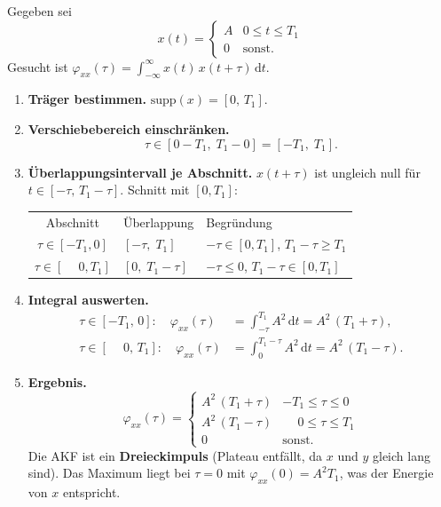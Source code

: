 \begin{beispiel}

Gegeben sei
$$
x(t) = \begin{cases} A & 0 \leq t \leq T_1 \\ 0 & \text{sonst.} \end{cases}
$$
Gesucht ist $\varphi_{xx}(\tau) = \int_{-\infty}^{\infty} x(t)\,x(t+\tau)\,\mathrm{d}t$.

\begin{enumerate}
  \item \textbf{Träger bestimmen.}
  $\mathrm{supp}(x) = [0,\,T_1]$.

  \item \textbf{Verschiebebereich einschränken.}
  $$\tau \in [0 - T_1,\; T_1 - 0] = [-T_1,\; T_1].$$

  \item \textbf{Überlappungsintervall je Abschnitt.}
  $x(t+\tau)$ ist ungleich null für $t \in [-\tau,\, T_1-\tau]$.
  Schnitt mit $[0, T_1]$:

  \begin{center}
  \begin{tabular}{cll}
    Abschnitt & Überlappung & Begründung \\[3pt]
    $\tau \in [-T_1, 0]$ & $[-\tau,\; T_1]$       & $-\tau \in [0,T_1]$,\; $T_1{-}\tau \geq T_1$ \\
    $\tau \in [\phantom{-}0, T_1]$ & $[0,\; T_1{-}\tau]$ & $-\tau \leq 0$,\; $T_1{-}\tau \in [0,T_1]$
  \end{tabular}
  \end{center}

  \item \textbf{Integral auswerten.}
  \begin{align*}
    \tau \in [-T_1,\, 0]\colon\quad
      \varphi_{xx}(\tau) &= \int_{-\tau}^{T_1} A^2\,\mathrm{d}t
        = A^2\,(T_1 + \tau), \\
    \tau \in [\phantom{-}0,\, T_1]\colon\quad
      \varphi_{xx}(\tau) &= \int_{0}^{T_1-\tau} A^2\,\mathrm{d}t
        = A^2\,(T_1 - \tau).
  \end{align*}

  \item \textbf{Ergebnis.}
  $$
  \varphi_{xx}(\tau) = \begin{cases}
    A^2\,(T_1 + \tau) & -T_1 \leq \tau \leq 0 \\
    A^2\,(T_1 - \tau) & \phantom{-}0 \leq \tau \leq T_1 \\
    0 & \text{sonst.}
  \end{cases}
  $$
  Die AKF ist ein \textbf{Dreieckimpuls} (Plateau entfällt, da $x$ und $y$ gleich lang
  sind). Das Maximum liegt bei $\tau = 0$ mit $\varphi_{xx}(0) = A^2 T_1$, was der
  Energie von $x$ entspricht.
\end{enumerate}

\end{beispiel}



